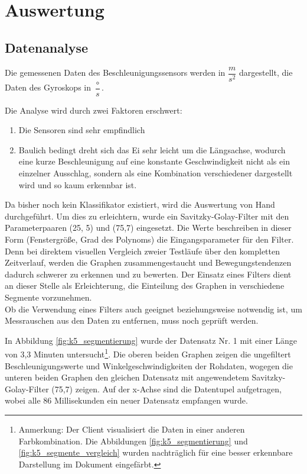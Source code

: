 \section{Auswertung}

\subsection{Datenanalyse}
Die gemessenen Daten des Beschleunigungssensors werden in $\dfrac{m}{s^{2}}$ 
dargestellt, die Daten des Gyroskops in $\dfrac{\circ}{s}$.

Die Analyse wird durch zwei Faktoren erschwert:
\begin{enumerate}
	\item Die Sensoren sind sehr empfindlich
	\item Baulich bedingt dreht sich das Ei sehr leicht um die Längsachse, wodurch eine kurze Beschleunigung auf eine konstante Geschwindigkeit nicht als ein einzelner Ausschlag, sondern als eine Kombination verschiedener dargestellt wird und so kaum erkennbar ist.
\end{enumerate}

Da bisher noch kein Klassifikator existiert, wird die Auswertung von Hand durchgeführt. Um dies zu erleichtern, wurde ein Savitzky-Golay-Filter mit den Parameterpaaren (25, 5) und (75,7) eingesetzt. Die Werte beschreiben in dieser Form (Fenstergröße, Grad des Polynoms) die Eingangsparameter für den Filter. Denn bei direktem visuellen Vergleich zweier Testläufe über den kompletten Zeitverlauf, werden die Graphen zusammengestaucht und Bewegungstendenzen dadurch schwerer zu erkennen und zu bewerten. Der Einsatz eines Filters dient an dieser Stelle als Erleichterung, die Einteilung des Graphen in verschiedene Segmente vorzunehmen. \\
Ob die Verwendung eines Filters auch geeignet beziehungsweise notwendig ist, um Messrauschen aus den Daten zu entfernen, muss noch geprüft werden.

In Abbildung \ref{fig:k5_segmentierung} wurde der Datensatz Nr. 1 mit einer Länge von 3,3 Minuten untersucht\footnote{Anmerkung: Der Client visualisiert die Daten in einer anderen Farbkombination. Die Abbildungen \ref{fig:k5_segmentierung} und \ref{fig:k5_segmente_vergleich} wurden nachträglich für eine besser erkennbare Darstellung im Dokument eingefärbt.}. Die oberen beiden Graphen zeigen die ungefiltert Beschleunigungswerte und Winkelgeschwindigkeiten der Rohdaten, wogegen die unteren beiden Graphen den gleichen Datensatz mit angewendetem Savitzky-Golay-Filter (75,7) zeigen. Auf der x-Achse sind die Datentupel aufgetragen, wobei alle 86 Millisekunden ein neuer Datensatz empfangen wurde.


